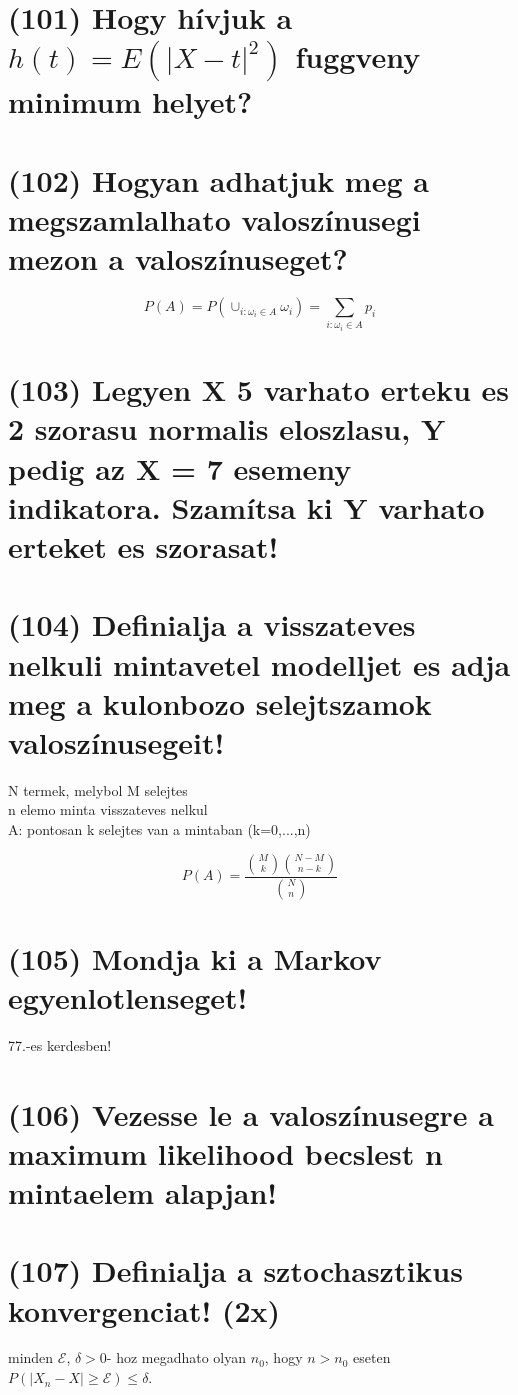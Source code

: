 \documentclass[12p]{article}
\begin{document}
\section{(101) Hogy hívjuk a $h(t) = E(|X - t|^2)$ fuggveny minimum helyet?}

\section{(102) Hogyan adhatjuk meg a megszamlalhato valoszínusegi mezon a valoszínuseget?}

$$P(A) = P(\cup_{i:\omega_i \in A} \omega_i) = \sum_{i:\omega_i \in A} p_i$$

\section{(103) Legyen X 5 varhato erteku es 2 szorasu normalis eloszlasu, Y pedig az X = 7 esemeny indikatora. Szamítsa ki Y varhato erteket es szorasat!}

\section{(104)  Definialja a visszateves nelkuli mintavetel modelljet es adja meg a kulonbozo selejtszamok valoszínusegeit!}

N termek, melybol M selejtes\\
n elemo minta visszateves nelkul\\
A: pontosan k selejtes van a mintaban
(k=0,...,n)

$$P(A) = \frac{{M \choose k}{{N - M} \choose {n - k}}}{{N \choose n}}$$

\section{(105) Mondja ki a Markov egyenlotlenseget!}

77.-es kerdesben!

\section{(106) Vezesse le a valoszínusegre a maximum likelihood becslest n mintaelem alapjan!}

\section{(107) Definialja a sztochasztikus konvergenciat! (2x)}

 minden $\mathcal{E}$, $\delta>0$-
hoz megadhato olyan $n_0$, hogy $n>n_0$ eseten $P(|X_n-X| \geq \mathcal{E}) \leq \delta$.
\end{document}
